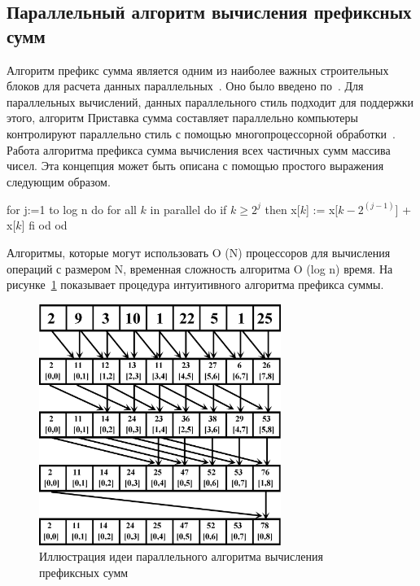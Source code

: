 \documentclass[specification,annotation,times]{itmo-student-thesis}
\newcommand{\revise}[1]{{\color{red!70!black} #1 }}
\begin{document}
\subsection{Параллельный алгоритм вычисления префиксных сумм}

\revise{
Алгоритм префикс сумма является одним из наиболее важных строительных блоков для расчета данных параллельных~\cite{sengupta06}. Оно было введено по~\cite{hillis86}. Для параллельных 
вычислений, данных параллельного стиль подходит для поддержки этого, алгоритм Приставка сумма составляет параллельно компьютеры контролируют параллельно стиль с помощью многопроцессорной
обработки~\cite{hillis86}. Работа алгоритма префикса сумма вычисления всех частичных сумм массива чисел. Эта концепция может быть описана с помощью простого выражения следующим образом.
}

\revise{
for j:=1 to log n do
    for all $k$ in parallel do
        if $k \ge 2^j$ then
            x[$k$] := x[$k - 2^(j-1)$] + x[$k$]
        fi
    od
od 
}

\revise{
Алгоритмы, которые могут использовать O (N) процессоров для вычисления операций с размером N, временная сложность алгоритма O (log n) время. На рисунке~\ref{fig:prefix-sum} показывает процедура 
интуитивного алгоритма префикса суммы.
}

\begin{figure}[!ht]
\centering
\includegraphics[width=0.7\textwidth]{pic/parallel-prefix-sum.png}
\caption{Иллюстрация идеи параллельного алгоритма вычисления префиксных сумм}\label{fig:prefix-sum}
\end{figure}

\chapterconclusion
\end{document}
